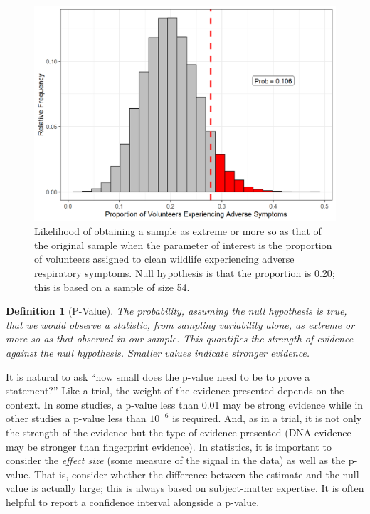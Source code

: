 \documentclass[
]{book}
\theoremstyle{plain}
\theoremstyle{mydefn}
\newtheorem{definition}{Definition}[chapter]
\theoremstyle{myexmpl}
\theoremstyle{remark}
\begin{document}
\begin{figure}

{\centering \includegraphics[width=0.8\linewidth]{./Images/nulldistns-deepwater-pvalue-1} 

}

\caption{Likelihood of obtaining a sample as extreme or more so as that of the original sample when the parameter of interest is the proportion of volunteers assigned to clean wildlife experiencing adverse respiratory symptoms.  Null hypothesis is that the proportion is 0.20; this is based on a sample of size 54.}\label{fig:nulldistns-deepwater-pvalue}
\end{figure}

\begin{definition}[P-Value]
\protect\hypertarget{def:defn-pvalue}{}{\label{def:defn-pvalue} {} }The probability, assuming the null hypothesis is true, that we would observe a statistic, from sampling variability alone, as extreme or more so as that observed in our sample. This quantifies the strength of evidence against the null hypothesis. Smaller values indicate stronger evidence.
\end{definition}

It is natural to ask ``how small does the p-value need to be to prove a statement?'' Like a trial, the weight of the evidence presented depends on the context. In some studies, a p-value less than 0.01 may be strong evidence while in other studies a p-value less than \(10^{-6}\) is required. And, as in a trial, it is not only the strength of the evidence but the type of evidence presented (DNA evidence may be stronger than fingerprint evidence). In statistics, it is important to consider the \emph{effect size} (some measure of the signal in the data) as well as the p-value. That is, consider whether the difference between the estimate and the null value is actually large; this is always based on subject-matter expertise. It is often helpful to report a confidence interval alongside a p-value.
\end{document}
